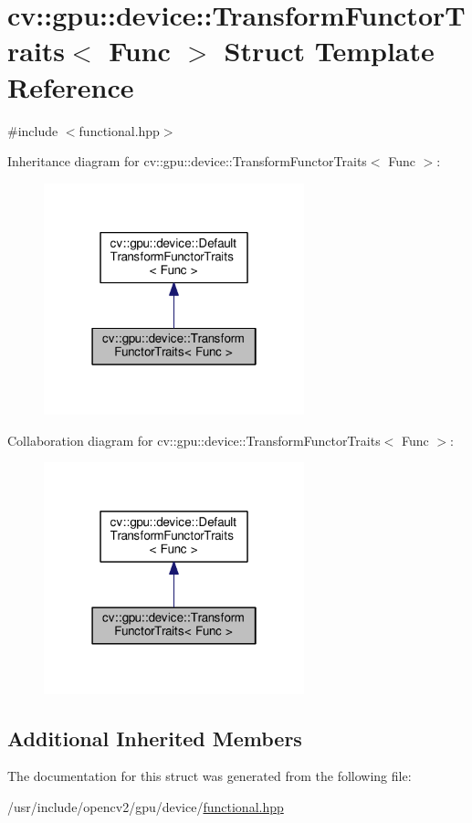 \hypertarget{structcv_1_1gpu_1_1device_1_1TransformFunctorTraits}{\section{cv\-:\-:gpu\-:\-:device\-:\-:Transform\-Functor\-Traits$<$ Func $>$ Struct Template Reference}
\label{structcv_1_1gpu_1_1device_1_1TransformFunctorTraits}
}


{\ttfamily \#include $<$functional.\-hpp$>$}



Inheritance diagram for cv\-:\-:gpu\-:\-:device\-:\-:Transform\-Functor\-Traits$<$ Func $>$\-:\nopagebreak
\begin{figure}[H]
\begin{center}
\leavevmode
\includegraphics[width=214pt]{structcv_1_1gpu_1_1device_1_1TransformFunctorTraits__inherit__graph}
\end{center}
\end{figure}


Collaboration diagram for cv\-:\-:gpu\-:\-:device\-:\-:Transform\-Functor\-Traits$<$ Func $>$\-:\nopagebreak
\begin{figure}[H]
\begin{center}
\leavevmode
\includegraphics[width=214pt]{structcv_1_1gpu_1_1device_1_1TransformFunctorTraits__coll__graph}
\end{center}
\end{figure}
\subsection*{Additional Inherited Members}


The documentation for this struct was generated from the following file\-:\begin{DoxyCompactItemize}
\item 
/usr/include/opencv2/gpu/device/\hyperlink{functional_8hpp}{functional.\-hpp}\end{DoxyCompactItemize}
